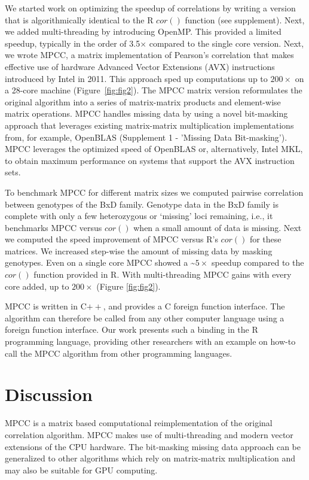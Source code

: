 \documentclass{bioinfo}
\begin{document}
We started work on optimizing the speedup of correlations by writing a
version that is algorithmically identical to the R $cor()$ function
(see supplement). Next, we added multi-threading by introducing
OpenMP. This provided a limited speedup, typically in the order of
3.5$\times$ compared to the single core version.  Next, we wrote MPCC,
a matrix implementation of Pearson's correlation that makes effective
use of hardware Advanced Vector Extensions (AVX) instructions
introduced by Intel in 2011. This approach sped up computations up to
$200\times$ on a 28-core machine (Figure~\ref{fig:fig2}).  The MPCC
matrix version reformulates the original algorithm into a series of
matrix-matrix products and element-wise matrix operations. MPCC
handles missing data by using a novel bit-masking approach that
leverages existing matrix-matrix multiplication implementations from,
for example, OpenBLAS (Supplement 1 - 'Missing Data Bit-masking').
MPCC leverages the optimized speed of OpenBLAS or, alternatively,
Intel\textregistered{} MKL, to obtain maximum performance on systems
that support the AVX instruction sets.

To benchmark MPCC for different matrix sizes we computed pairwise
correlation between genotypes of the BxD family.  Genotype data in the
BxD family is complete with only a few heterozygous or `missing' loci
remaining, i.e., it benchmarks MPCC versus $cor()$ when a small amount
of data is missing.  Next we computed the speed improvement of MPCC
versus R's $cor()$ for these matrices. We increased step-wise the
amount of missing data by masking genotypes. Even on a single core
MPCC showed a
\textasciitilde{}$5\times$ speedup compared to the $cor()$
function provided in R. With multi-threading MPCC
gains with every core added, up to $200\times$ (Figure \ref{fig:fig2}).

MPCC is written in C$++$, and provides a C foreign function interface.
The algorithm can therefore be called from any other computer language
using a foreign function interface. Our work presents such a binding
in the R programming language, providing other researchers with
an example on how-to call the MPCC algorithm from other programming languages.

\vspace*{2mm}
\section{Discussion}

MPCC is a matrix based computational reimplementation of the original
correlation algorithm. MPCC makes use of multi-threading and modern
vector extensions of the CPU hardware.  The bit-masking missing data
approach can be generalized to other algorithms which rely on
matrix-matrix multiplication and may also be suitable for GPU
computing.
\end{document}
